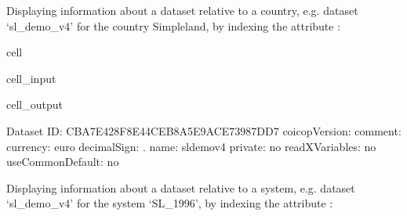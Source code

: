 \documentclass[letterpaper,10pt,english]{sphinxmanual}
\begin{document}
\sphinxAtStartPar
Displaying information about a dataset relative to a country, e.g. dataset ‘sl\_demo\_v4’ for the country Simpleland, by indexing the attribute :

\begin{sphinxuseclass}{cell}
\begin{sphinxuseclass}{cell_input}
\begin{sphinxVerbatim}[commandchars=\\\{\}]
\PYG{p}{[}\PYG{p}{]}\PYG{p}{[}\PYG{p}{]}
\end{sphinxVerbatim}

\end{sphinxuseclass}
\begin{sphinxuseclass}{cell_output}
\begin{sphinxVerbatim}[commandchars=\\\{\}]
\PYGZhy{}\PYGZhy{}\PYGZhy{}\PYGZhy{}\PYGZhy{}\PYGZhy{}\PYGZhy{}\PYGZhy{}\PYGZhy{}\PYGZhy{}\PYGZhy{}\PYGZhy{}\PYGZhy{}\PYGZhy{}\PYGZhy{}\PYGZhy{}\PYGZhy{}\PYGZhy{}\PYGZhy{}\PYGZhy{}\PYGZhy{}\PYGZhy{}\PYGZhy{}\PYGZhy{}\PYGZhy{}\PYGZhy{}\PYGZhy{}\PYGZhy{}\PYGZhy{}\PYGZhy{}
Dataset
\PYGZhy{}\PYGZhy{}\PYGZhy{}\PYGZhy{}\PYGZhy{}\PYGZhy{}\PYGZhy{}\PYGZhy{}\PYGZhy{}\PYGZhy{}\PYGZhy{}\PYGZhy{}\PYGZhy{}\PYGZhy{}\PYGZhy{}\PYGZhy{}\PYGZhy{}\PYGZhy{}\PYGZhy{}\PYGZhy{}\PYGZhy{}\PYGZhy{}\PYGZhy{}\PYGZhy{}\PYGZhy{}\PYGZhy{}\PYGZhy{}\PYGZhy{}\PYGZhy{}\PYGZhy{}
	 ID: \PYGZsq{}CBA7E428\PYGZhy{}F8E4\PYGZhy{}4CEB\PYGZhy{}8A5E\PYGZhy{}9ACE73987DD7\PYGZsq{}
	 coicopVersion: \PYGZsq{}\PYGZsq{}
	 comment: \PYGZsq{}\PYGZsq{}
	 currency: \PYGZsq{}euro\PYGZsq{}
	 decimalSign: \PYGZsq{}.\PYGZsq{}
	 name: \PYGZsq{}sl\PYGZus{}demo\PYGZus{}v4\PYGZsq{}
	 private: \PYGZsq{}no\PYGZsq{}
	 readXVariables: \PYGZsq{}no\PYGZsq{}
	 useCommonDefault: \PYGZsq{}no\PYGZsq{}
\end{sphinxVerbatim}

\end{sphinxuseclass}
\end{sphinxuseclass}
\sphinxAtStartPar
Displaying information about a dataset relative to a system, e.g. dataset ‘sl\_demo\_v4’ for the system ‘SL\_1996’, by indexing the attribute :
\end{document}
